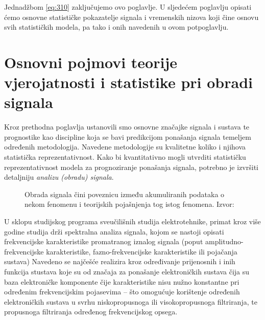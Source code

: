 \documentclass[a4paper,12pt,oneside]{memoir}
\begin{document}
                Jednadžbom \eqref{eq:310} zaključujemo ovo poglavlje. U sljedećem poglavlju opisati ćemo osnovne statističke pokazatelje signala i vremenskih nizova koji čine osnovu svih statističkih modela, pa tako i onih navedenih u ovom potpoglavlju.        

    \chapter{Osnovni pojmovi teorije vjerojatnosti i statistike pri obradi signala}


        Kroz prethodna poglavlja ustanovili smo osnovne značajke signala i sustava te prognostike kao discipline koja se bavi predikcijom ponašanja signala temeljem određenih metodologija. Navedene metodologije su kvalitetne koliko i njihova statistička reprezentativnost. Kako bi kvantitativno mogli utvrditi statističku reprezentativnost modela za prognoziranje ponašanja signala, potrebno je izvršiti detaljniju \textit{analizu (obradu) signala}.

        \begin{figure}[H]
            \centering
            \caption{Obrada signala čini poveznicu između akumuliranih podataka o nekom fenomenu i teorijskih pojašnjenja tog istog fenomena. Izvor: \cite{Broersen}}
            \label{fig:41}
        \end{figure}
        
        U sklopu studijskog programa sveučilišnih studija elektrotehnike, primat kroz više godine studija drži spektralna analiza signala, kojom se nastoji opisati frekvencijske  karakteristike promatranog iznalog signala (poput amplitudno-frekvencijske  karakteristike, fazno-frekvencijske karakteristike ili pojačanja sustava) Navedeno se najčešće realizira kroz određivanje prijenosnih i inih funkcija stustava koje su od značaja za ponašanje elektroničkih sustava čija su baza elektroničke komponente čije karakteristike nisu nužno konstantne pri određenim frekvencijskim pojasevima -- što omogućuje korištenje određenih elektroničkih sustava u svrhu niskopropusnoga ili visokopropusnoga filtriranja, te propusnoga filtriranja određenog frekvencijskog opsega.
\end{document}

